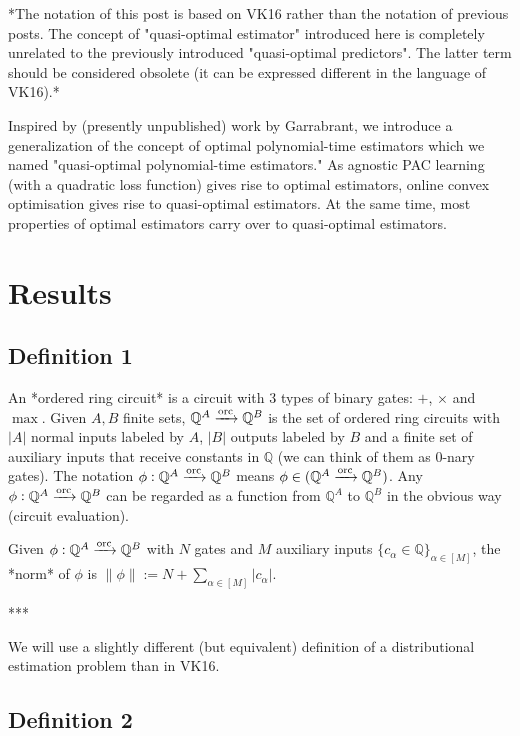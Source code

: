 \documentclass[a4paper]{article}
\newcommand{\Rats}{\mathbb{Q}}
\newcommand{\Abs}[1]{\lvert #1 \rvert}
\newcommand{\Norm}[1]{\lVert #1 \rVert}
\newcommand{\ORC}{\xrightarrow{\textnormal{orc}}}
\begin{document}
*The notation of this post is based on VK16 rather than the notation of previous posts. The concept of "quasi-optimal estimator" introduced here is completely unrelated to the previously introduced "quasi-optimal predictors". The latter term should be considered obsolete (it can be expressed different in the language of VK16).*

Inspired by (presently unpublished) work by Garrabrant, we introduce a generalization of the concept of optimal polynomial-time estimators which we named "quasi-optimal polynomial-time estimators." As agnostic PAC learning (with a quadratic loss function) gives rise to optimal estimators, online convex optimisation gives rise to quasi-optimal estimators. At the same time, most properties of optimal estimators carry over to quasi-optimal estimators.

\section{Results}

\subsection{Definition 1}

An *ordered ring circuit* is a circuit with 3 types of binary gates: ${+}$, ${\times}$ and ${\max}$. Given ${A,B}$ finite sets, ${\Rats^A \ORC \Rats^B}$ is the set of ordered ring circuits with $\Abs{A}$ normal inputs labeled by ${A}$, ${\Abs{B}}$ outputs labeled by ${B}$ and a finite set of auxiliary inputs that receive constants in ${\Rats}$ (we can think of them as 0-nary gates). The notation ${\phi: \Rats^A \ORC \Rats^B}$ means ${\phi \in (\Rats^A \ORC \Rats^B)}$. Any ${\phi: \Rats^A \ORC \Rats^B}$ can be regarded as a function from ${\Rats^A}$ to ${\Rats^B}$ in the obvious way (circuit evaluation). 

Given ${\phi: \Rats^A \ORC \Rats^B}$ with ${N}$ gates and ${M}$ auxiliary inputs ${\{c_\alpha \in \Rats\}_{\alpha \in [M]}}$, the *norm* of ${\phi}$ is ${\Norm{\phi}:=N+\sum_{\alpha \in [M]} \Abs{c_\alpha}}$.

***

We will use a slightly different (but equivalent) definition of a distributional estimation problem than in VK16.

\subsection{Definition 2}
\end{document}
